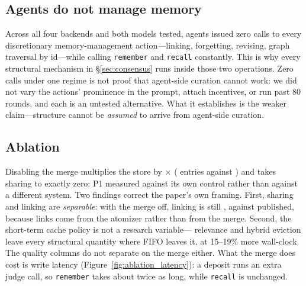 \documentclass{article}
\newcommand{\code}[1]{\texttt{\small #1}}
\begin{document}
\subsection{Agents do not manage memory}
\label{sec:nomgmt}
Across all four backends and both models tested, agents issued zero calls to
every discretionary memory-management action---linking, forgetting, revising,
graph traversal by id---while calling \code{remember} and \code{recall}
constantly. This is why every structural mechanism in \S\ref{sec:consensus} runs
inside those two operations. Zero calls under one regime is not proof that
agent-side curation cannot work: we did not vary the actions' prominence in the
prompt, attach incentives, or run past 80 rounds, and each is an untested
alternative. What it establishes is the weaker claim---structure cannot be
\emph{assumed} to arrive from agent-side curation.

\subsection{Ablation}
\label{sec:ablation}

\begin{table}[t]
\centering
\caption{One factor at a time from the published configuration, consensus on
Three Kingdoms, 40 rounds. All four quality metrics here read the event log, so
they compare across cells rather than against Table~\ref{tab:quality}.}
\label{tab:ablation}
\resizebox{\textwidth}{!}{}
\end{table}

Disabling the merge multiplies the store by \AblFactor{}$\times$
(\AblOffEntries{} entries against \AblOnEntries{}) and takes sharing to exactly
zero: P1 measured against its own control rather than against a different
system. Two findings correct the paper's own framing. First, sharing and linking
are \emph{separable}: with the merge off, linking is still \AblOffAff{}, against
\AblOnAff{} published, because links come from the atomizer rather than from the
merge. Second, the short-term cache policy is not a research variable---
relevance and hybrid eviction leave every structural quantity where FIFO leaves
it, at 15--19\% more wall-clock. The quality columns do not separate on the merge
either. What the merge does cost is write latency
(Figure~\ref{fig:ablation_latency}): a deposit runs an extra judge call, so
\code{remember} takes about twice as long, while \code{recall} is unchanged.
\end{document}
